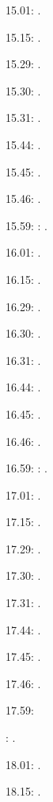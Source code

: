 \documentclass[italian]{article}
\begin{document}
15.01:     . 

15.15:     . 

15.29:     . 

15.30:     .

15.31:     .

15.44:     .

15.45:     .

15.46:     .

15.59:     
:    .

16.01:     . 

16.15:     . 

16.29:     . 

16.30:     .

16.31:     .

16.44:     .

16.45:     .

16.46:     .

16.59:     
:    .

17.01:     . 

17.15:     . 

17.29:     . 

17.30:     .

17.31:     .

17.44:     .

17.45:     .

17.46:     .

17.59:     

:    .

18.01:     . 

18.15:     . 
\end{document}
